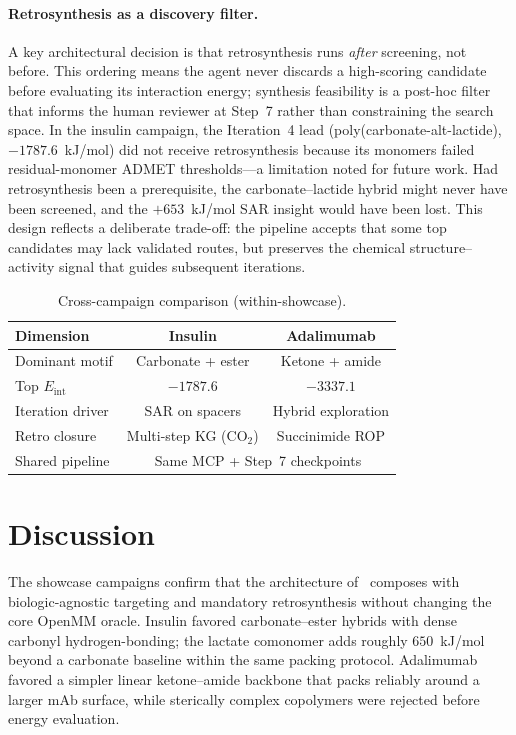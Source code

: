 \documentclass[twocolumn]{fairmeta}
\begin{document}
\paragraph{Retrosynthesis as a discovery filter.}
A key architectural decision is that retrosynthesis runs \emph{after} screening, not before.
This ordering means the agent never discards a high-scoring candidate before evaluating its interaction energy; synthesis feasibility is a post-hoc filter that informs the human reviewer at Step~7 rather than constraining the search space.
In the insulin campaign, the Iteration~4 lead (poly(carbonate-alt-lactide), $-1787.6$~kJ/mol) did not receive retrosynthesis because its monomers failed residual-monomer ADMET thresholds---a limitation noted for future work.
Had retrosynthesis been a prerequisite, the carbonate--lactide hybrid might never have been screened, and the $+653$~kJ/mol SAR insight would have been lost.
This design reflects a deliberate trade-off: the pipeline accepts that some top candidates may lack validated routes, but preserves the chemical structure--activity signal that guides subsequent iterations.

\begin{table}[t]
\centering
\caption{Cross-campaign comparison (within-showcase).}
\label{tab:cross}
\small
\begin{tabularx}{\columnwidth}{Xcc}
\toprule
Dimension & Insulin & Adalimumab \\
\midrule
Dominant motif & Carbonate + ester & Ketone + amide \\
Top $E_\text{int}$ & $-1787.6$ & $-3337.1$ \\
Iteration driver & SAR on spacers & Hybrid exploration \\
Retro closure & Multi-step KG (CO$_2$) & Succinimide ROP \\
Shared pipeline & \multicolumn{2}{c}{Same MCP + Step~7 checkpoints} \\
\bottomrule
\end{tabularx}
\end{table}

\FloatBarrier
\section{Discussion}
\label{sec:discussion}

The showcase campaigns confirm that the architecture of~\cite{martins2026insulin} composes with biologic-agnostic targeting and mandatory retrosynthesis without changing the core OpenMM oracle.
Insulin favored carbonate--ester hybrids with dense carbonyl hydrogen-bonding; the lactate comonomer adds roughly $650$~kJ/mol beyond a carbonate baseline within the same packing protocol.
Adalimumab favored a simpler linear ketone--amide backbone that packs reliably around a larger mAb surface, while sterically complex copolymers were rejected before energy evaluation.
\end{document}
